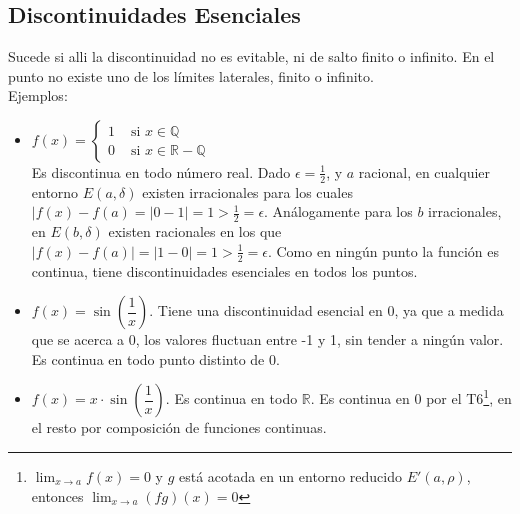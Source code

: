 \documentclass[11pt,a4paper]{article}
\begin{document}
\subsection{Discontinuidades Esenciales}
Sucede si alli la discontinuidad no es evitable, ni de salto finito o infinito. En el punto no existe uno de los l\'imites laterales, finito o infinito.\\
Ejemplos: 
\begin{itemize}
\item $f(x)=\left\{\begin{array}{ll} 1 & \text{ si } x \in \mathbb{Q} \\ 0 & \text{ si } x \in \mathbb{R - Q}\end{array}\right.$ \\ Es discontinua en todo n\'umero real. Dado $\epsilon = \frac{1}{2}$, y $a$ racional, en cualquier entorno $E(a,\delta)$ existen irracionales para los cuales $|f(x)-f(a) = |0-1| = 1 > \frac{1}{2} = \epsilon$. An\'alogamente para los $b$ irracionales, en $E(b,\delta)$ existen racionales en los que $|f(x)-f(a)| = |1-0| = 1 > \frac{1}{2} = \epsilon$. Como en ning\'un punto la funci\'on es continua, tiene discontinuidades esenciales en todos los puntos.
\item $f(x)=\sin\left(\dfrac{1}{x}\right)$. Tiene una discontinuidad esencial en $0$, ya que a medida que se acerca a $0$, los valores fluctuan entre -1 y 1, sin tender a ning\'un valor. Es continua en todo punto distinto de 0.
\item $f(x)=x\cdot\sin\left(\dfrac{1}{x}\right)$. Es continua en todo $\mathbb{R}$. Es continua en 0 por el T6\footnote{$\displaystyle{\lim_{x\to a}f(x) = 0}$ y $g$ est\'a acotada en un entorno reducido $E'(a,\rho)$, entonces $\displaystyle{\lim_{x\to a}(fg)(x) = 0}$}, en el resto por composici\'on de funciones continuas.
\end{itemize}

\newpage
\end{document}
